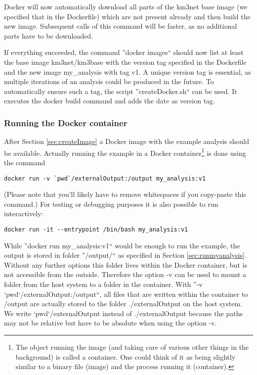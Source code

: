 \documentclass[a4paper, twoside, 11pt]{article}
\begin{document}
Docker will now automatically download all parts of the km3net base image 
(we specified that in the Dockerfile)
which are not present already and then build the new image. 
Subsequent calls of this command will be faster, as no additional parts have to be downloaded. 

If everything succeeded, the command ''docker images`` 
should now list at least the base image km3net/km3base 
with the version tag specified in the Dockerfile and 
the new image my\_analysis with tag v1. 
A unique version tag is essential, as multiple iterations of an analysis could be produced in the future. 
To automatically ensure such a tag, the script ''createDocker.sh`` can be used.
It executes the docker build command and adds the date as version tag. 


\subsubsection{Running the Docker container}
\label{sec:runContainer}

After Section \ref{sec:createImage} a Docker image with the example analysis should be available. 
Actually running the example in a Docker container\footnote{The object running the image 
(and taking care of various other things in the background) is called a container. 
One could think of it as being slightly similar to a binary file (image) and the process running it (container).} 
is done using the command 
\begin{lstlisting}[basicstyle=\ttfamily\small,upquote=true,columns=flexible,keepspaces=true,frame=single]
docker run -v `pwd`/externalOutput:/output my_analysis:v1
\end{lstlisting}
(Please note that you'll likely have to remove whitespaces if you copy-paste this command.)
For testing or debugging purposes it is also possible to run interactively:
\begin{lstlisting}[basicstyle=\ttfamily\small,upquote=true,columns=flexible,keepspaces=true,frame=single]
docker run -it --entrypoint /bin/bash my_analysis:v1
\end{lstlisting}
While ''docker run my\_analysis:v1``
would be enough to run the example, the output is stored in folder 
''/output/`` as specified in Section \ref{sec:runmyanalysis}.
Without any further options this folder lives within the Docker container, but is not accessible from the outside. 
Therefore the option -v can be used to mount a folder from the host system to a folder in the container. 
With ''-v `pwd`/externalOutput:/output``, all files that are written within the container to /output 
are actually stored to the folder ./externalOutput on the host system. 
We write `pwd`/externalOutput instead of ./externalOutput because the 
paths may not be relative but have to be absolute when using the option -v. 
\end{document}
